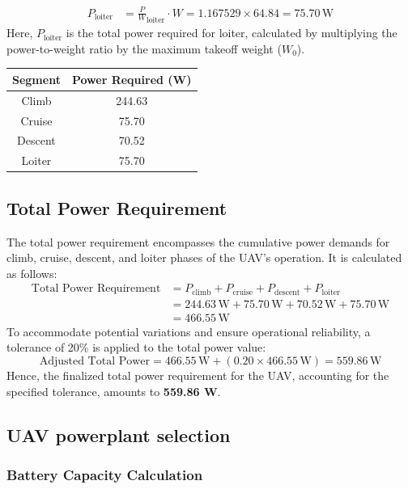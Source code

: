 \documentclass[12 pt]{article}
\begin{document}
\begin{align*}
P_{\text{loiter}} &= \frac{P}{W}_{\text{loiter}} \cdot W = 1.167529 \times 64.84 = 75.70 \, \text{W} \tag{3.31}
\end{align*}
Here, $P_{\text{loiter}}$ is the total power required for loiter, calculated by multiplying the power-to-weight ratio by the maximum takeoff weight ($W_0$).

\begin{center}
\begin{tabular}{|c|c|}
\hline
Segment & Power Required (W) \\
\hline
Climb & 244.63 \\
Cruise & 75.70 \\
Descent & 70.52 \\
Loiter & 75.70 \\
\hline
\end{tabular}
\end{center}

\subsection{{Total Power Requirement}}
The total power requirement encompasses the cumulative power demands for climb, cruise, descent, and loiter phases of the UAV's operation. It is calculated as follows:
\begin{align*}
\text{Total Power Requirement} &= P_{\text{climb}} + P_{\text{cruise}} + P_{\text{descent}} + P_{\text{loiter}} \tag{3.32}\\
&= 244.63 \, \text{W} + 75.70 \, \text{W} + 70.52 \, \text{W} + 75.70 \, \text{W} \\
&= 466.55 \, \text{W}
\end{align*}
To accommodate potential variations and ensure operational reliability, a tolerance of 20\% is applied to the total power value:
\[
\text{Adjusted Total Power} = 466.55 \, \text{W} + (0.20 \times 466.55 \, \text{W}) = 559.86 \, \text{W}
\tag{3.33}\]
Hence, the finalized total power requirement for the UAV, accounting for the specified tolerance, amounts to \textbf{559.86 W}.

\subsection{{UAV powerplant selection}}

\subsubsection{{Battery Capacity Calculation}}
\end{document}
